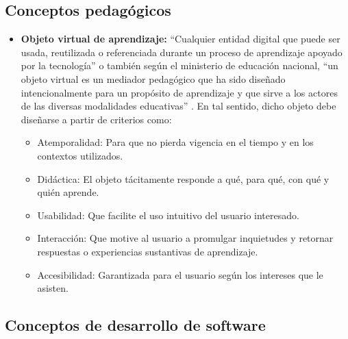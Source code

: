\documentclass[letterpaper, 11pt, oneside]{article}
\theoremstyle{definition}
\theoremstyle{remark}
\begin{document}
\newpage

\subsection{Conceptos pedagógicos} %
\begin{itemize}

\item \textbf{Objeto virtual de aprendizaje:} “Cualquier entidad digital que puede ser usada, reutilizada o referenciada durante un proceso de aprendizaje apoyado por la tecnología” \cite{IEEE2006} o también según el ministerio de educación nacional, “un objeto virtual es un mediador pedagógico que ha sido diseñado intencionalmente para un propósito de aprendizaje y que sirve a los actores de las diversas modalidades educativas” \cite{Roldan05}. 
En tal sentido, dicho objeto debe diseñarse a partir de criterios como: 
\begin{itemize}
\item Atemporalidad: Para que no pierda vigencia en el tiempo y en los contextos utilizados. 
\item Didáctica: El objeto tácitamente responde a qué, para qué, con qué y quién aprende. 
\item Usabilidad: Que facilite el uso intuitivo del usuario interesado. 
\item Interacción: Que motive al usuario a promulgar inquietudes y retornar respuestas o experiencias sustantivas de aprendizaje. 
\item Accesibilidad: Garantizada para el usuario según los intereses que le asisten. 
\end{itemize}
\end{itemize}
\clearpage
\subsection{Conceptos de desarrollo de software}
\end{document}
